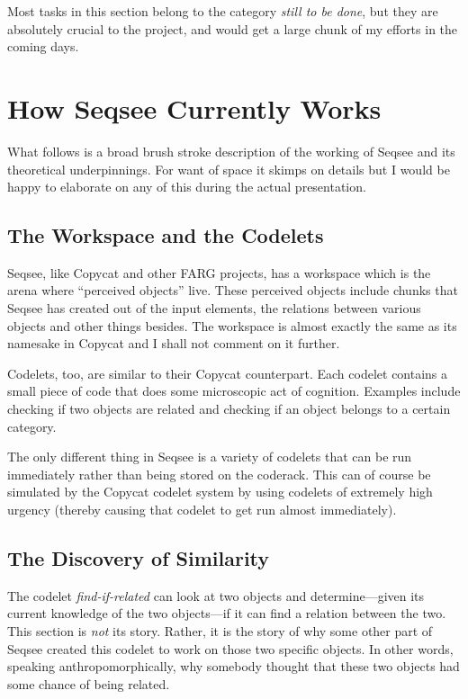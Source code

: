 \documentclass[letterpaper]{article}
\begin{document}
Most tasks in this section belong to the category \emph{still to be done}, but they are absolutely crucial to the project, and would get a large chunk of my efforts in the coming days.



\section{How Seqsee Currently Works}
\label{sec:how}

What follows is a broad brush stroke description of the working of Seqsee and its theoretical underpinnings.  For want of space it skimps on details but I would be happy to elaborate on any of this during the actual presentation.

\subsection{The Workspace and the Codelets}

Seqsee, like Copycat and other FARG projects, has a workspace which is the arena where ``perceived objects'' live.  These perceived objects include chunks that Seqsee has created out of the input elements, the relations between various objects and other things besides.  The workspace is almost exactly the same as its namesake in Copycat and I shall not comment on it further.

Codelets, too, are similar to their Copycat counterpart. Each codelet contains a small piece of code that does some microscopic act of cognition.  Examples include checking if two objects are related and checking if an object belongs to a certain category.

The only different thing in Seqsee is a variety of codelets that can be run immediately rather than being stored on the coderack.  This can of course be simulated by the Copycat codelet system by using codelets of extremely high urgency (thereby causing that codelet to get run almost immediately).

\subsection{The Discovery of Similarity}

The codelet \emph{find-if-related} can look at two objects and determine---given its current knowledge of the two objects---if it can find a relation between the two.  This section is \emph{not} its story.  Rather, it is the story of why some other part of Seqsee created this codelet to work on those two specific objects.  In other words, speaking anthropomorphically, why somebody thought that these two objects had some chance of being related.
\end{document}
